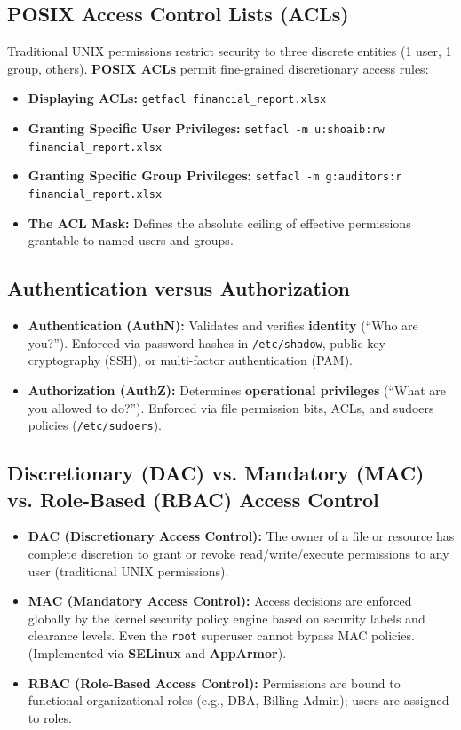 \subsection{POSIX Access Control Lists (ACLs)}
Traditional UNIX permissions restrict security to three discrete entities (1 user, 1 group, others). \textbf{POSIX ACLs} permit fine-grained discretionary access rules:
\begin{itemize}
    \item \textbf{Displaying ACLs:} \texttt{getfacl financial\_report.xlsx}
    \item \textbf{Granting Specific User Privileges:} \texttt{setfacl -m u:shoaib:rw financial\_report.xlsx}
    \item \textbf{Granting Specific Group Privileges:} \texttt{setfacl -m g:auditors:r financial\_report.xlsx}
    \item \textbf{The ACL Mask:} Defines the absolute ceiling of effective permissions grantable to named users and groups.
\end{itemize}

\subsection{Authentication versus Authorization}
\begin{itemize}
    \item \textbf{Authentication (AuthN):} Validates and verifies \textbf{identity} (``Who are you?''). Enforced via password hashes in \texttt{/etc/shadow}, public-key cryptography (SSH), or multi-factor authentication (PAM).
    \item \textbf{Authorization (AuthZ):} Determines \textbf{operational privileges} (``What are you allowed to do?''). Enforced via file permission bits, ACLs, and sudoers policies (\texttt{/etc/sudoers}).
\end{itemize}

\subsection{Discretionary (DAC) vs. Mandatory (MAC) vs. Role-Based (RBAC) Access Control}
\begin{itemize}
    \item \textbf{DAC (Discretionary Access Control):} The owner of a file or resource has complete discretion to grant or revoke read/write/execute permissions to any user (traditional UNIX permissions).
    \item \textbf{MAC (Mandatory Access Control):} Access decisions are enforced globally by the kernel security policy engine based on security labels and clearance levels. Even the \texttt{root} superuser cannot bypass MAC policies. (Implemented via \textbf{SELinux} and \textbf{AppArmor}).
    \item \textbf{RBAC (Role-Based Access Control):} Permissions are bound to functional organizational roles (e.g., DBA, Billing Admin); users are assigned to roles.
\end{itemize}

